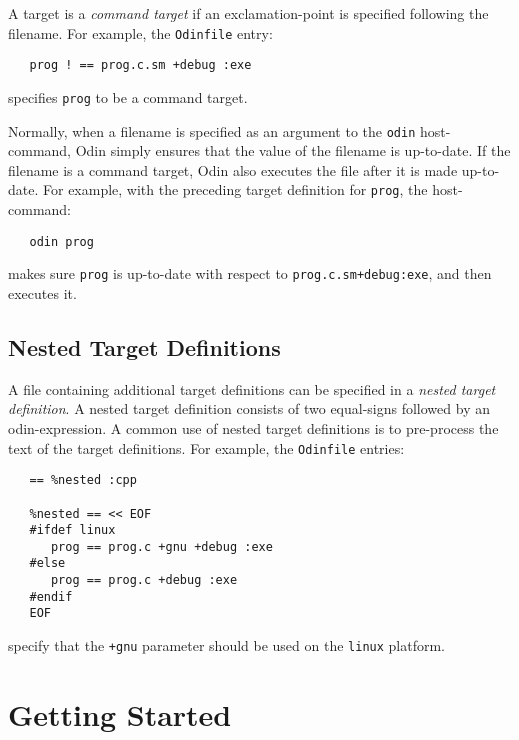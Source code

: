 \documentclass[hidelinks]{report}
\newcommand{\ex}{\tt}   %
\begin{document}
A target is a {\em command target}
if an exclamation-point is specified following the filename.
For example, the {\ex Odinfile} entry:
\begin{verbatim}
   prog ! == prog.c.sm +debug :exe
\end{verbatim}
specifies {\ex prog} to be a command target.

Normally, when a filename is specified as an argument
to the {\ex odin} host-command,
Odin simply ensures that the value of the filename is up-to-date.
If the filename is a command target,
Odin also executes the file after it is made up-to-date.
For example, with the preceding target definition for {\ex prog},
the host-command:
\begin{verbatim}
   odin prog
\end{verbatim}
makes sure {\ex prog} is up-to-date with respect to
{\ex prog.c.sm+debug:exe}, and then executes it.


\section{Nested Target Definitions}
\label{nestedtarget}

A file containing additional target definitions can be specified in a
{\em nested target definition}.
A nested target definition consists of two equal-signs followed by an
odin-expression.
A common use of nested target definitions is to pre-process the text
of the target definitions.
For example, the {\ex Odinfile} entries:
\begin{verbatim}
   == %nested :cpp

   %nested == << EOF
   #ifdef linux
      prog == prog.c +gnu +debug :exe
   #else
      prog == prog.c +debug :exe
   #endif
   EOF
\end{verbatim}
specify that the {\ex +gnu} parameter should be used
on the {\ex linux} platform.


\chapter{Getting Started}
\end{document}
